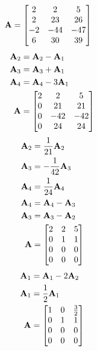 \documentclass{article}
\begin{document}
\begin{align*}
	\mathbf{A} & =
		\begin{bmatrix}
			2 & 2 & 5 \\
			2 & 23 & 26 \\
			-2 & -44 & -47 \\
			6 & 30 & 39
		\end{bmatrix}
\end{align*}
\begin{align*}
	\mathbf{A}_2 & = \mathbf{A}_2 - \mathbf{A}_1 \\
	\mathbf{A}_3 & = \mathbf{A}_3 + \mathbf{A}_1 \\
	\mathbf{A}_4 & = \mathbf{A}_4 - 3\mathbf{A}_1 \\
	\mathbf{A} & =
		\begin{bmatrix}
			2 & 2 & 5 \\
			0 & 21 & 21 \\
			0 & -42 & -42 \\
			0 & 24 & 24
		\end{bmatrix}
\end{align*}
\begin{align*}
	\mathbf{A}_2 & = \frac{1}{21}\mathbf{A}_2 \\
	\mathbf{A}_3 & = -\frac{1}{42}\mathbf{A}_3 \\
	\mathbf{A}_4 & = \frac{1}{24}\mathbf{A}_4 \\
	\mathbf{A}_4 & = \mathbf{A}_4 - \mathbf{A}_3 \\
	\mathbf{A}_3 & = \mathbf{A}_3 - \mathbf{A}_2 \\
	\mathbf{A} & =
		\begin{bmatrix}
			2 & 2 & 5 \\
			0 & 1 & 1 \\
			0 & 0 & 0 \\
			0 & 0 & 0
		\end{bmatrix}
\end{align*}
\begin{align*}
	\mathbf{A}_1 & = \mathbf{A}_1 - 2\mathbf{A}_2 \\
	\mathbf{A}_1 & = \frac{1}{2}\mathbf{A}_1 \\
	\mathbf{A} & =
		\begin{bmatrix}
			1 & 0 & \frac{3}{2} \\
			0 & 1 & 1 \\
			0 & 0 & 0 \\
			0 & 0 & 0
		\end{bmatrix}
\end{align*}
\end{document}
